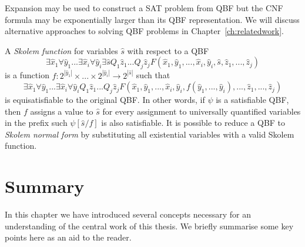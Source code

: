 Expansion may be used to construct a SAT problem from QBF but the CNF formula may be exponentially larger than its QBF representation. We will discuss alternative approaches to solving QBF problems in Chapter~\ref{ch:relatedwork}.

A \emph{Skolem function} for variables $\hat{s}$ with respect to a QBF $$\exists \hat{x}_1 \forall \hat{y}_1 ... \exists \hat{x}_i \forall \hat{y}_i \exists \hat{s} Q_1 \hat{z}_1 ... Q_j \hat{z}_j F(\hat{x}_1, \hat{y}_1, ..., \hat{x}_i, \hat{y}_i, \hat{s}, \hat{z}_1, ..., \hat{z}_j)$$ is a function $f : 2^{|\hat{y}_1|} \times ... \times 2^{|\hat{y}_i|} \to 2^{|\hat{s}|}$ such that $$\exists \hat{x}_1 \forall \hat{y}_1 ... \exists \hat{x}_i \forall \hat{y}_i Q_1 \hat{z}_1 ... Q_j \hat{z}_j F(\hat{x}_1, \hat{y}_1, ..., \hat{x}_i, \hat{y}_i, f(\hat{y}_1, ..., \hat{y}_i), ..., \hat{z}_1, ..., \hat{z}_j)$$ is equisatisfiable to the original QBF. In other words, if $\psi$ is a satisfiable QBF, then $f$ assigns a value to $\hat{s}$ for every assignment to universally quantified variables in the prefix such $\psi[\hat{s} / f]$ is also satisfiable. It is possible to reduce a QBF to \emph{Skolem normal form} by substituting all existential variables with a valid Skolem function.


\section{Summary}

In this chapter we have introduced several concepts necessary for an understanding of the central work of this thesis. We briefly summarise some key points here as an aid to the reader.

